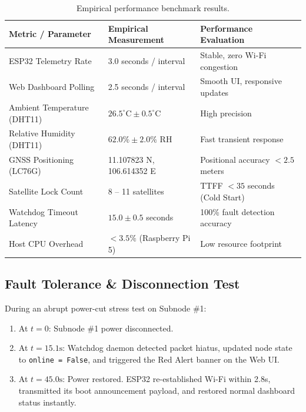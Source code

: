 \documentclass[11pt,a4paper]{article}
\begin{document}
\begin{table}[htbp]
    \centering
    \caption{Empirical performance benchmark results.}
    \label{tab:test_results}
    \begin{tabular}{lll}
        \toprule
        \textbf{Metric / Parameter} & \textbf{Empirical Measurement} & \textbf{Performance Evaluation} \\
        \midrule
        ESP32 Telemetry Rate & 3.0 seconds / interval & Stable, zero Wi-Fi congestion \\
        Web Dashboard Polling & 2.5 seconds / interval & Smooth UI, responsive updates \\
        Ambient Temperature (DHT11) & $26.5^\circ\text{C} \pm 0.5^\circ\text{C}$ & High precision \\
        Relative Humidity (DHT11) & $62.0\% \pm 2.0\%$ RH & Fast transient response \\
        GNSS Positioning (LC76G) & 11.107823 N, 106.614352 E & Positional accuracy $< 2.5$ meters \\
        Satellite Lock Count & 8 -- 11 satellites & TTFF $< 35$ seconds (Cold Start) \\
        Watchdog Timeout Latency & $15.0 \pm 0.5$ seconds & 100\% fault detection accuracy \\
        Host CPU Overhead & $< 3.5\%$ (Raspberry Pi 5) & Low resource footprint \\
        \bottomrule
    \end{tabular}
\end{table}

\subsection{Fault Tolerance \& Disconnection Test}
During an abrupt power-cut stress test on Subnode \#1:
\begin{enumerate}
    \item At $t = 0$: Subnode \#1 power disconnected.
    \item At $t = 15.1\text{s}$: Watchdog daemon detected packet hiatus, updated node state to \texttt{online = False}, and triggered the Red Alert banner on the Web UI.
    \item At $t = 45.0\text{s}$: Power restored. ESP32 re-established Wi-Fi within 2.8s, transmitted its boot announcement payload, and restored normal dashboard status instantly.
\end{enumerate}

\vspace{1em}
\end{document}
